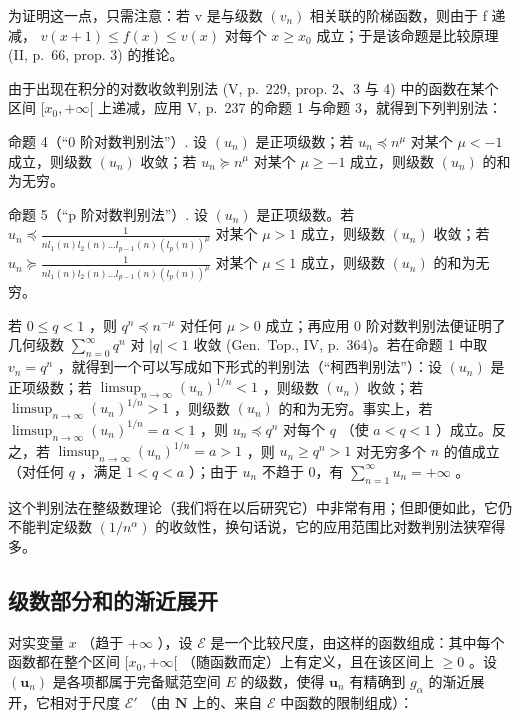 为证明这一点，只需注意：若 v 是与级数 \((v_{n})\) 相关联的阶梯函数，则由于 f 递减， \(v(x+1) \leqslant f(x) \leqslant v(x)\) 对每个 \(x \geqslant x_{0}\) 成立；于是该命题是比较原理 (II, p.~66, prop. 3) 的推论。

由于出现在积分的对数收敛判别法 (V, p.~229, prop. 2、3 与 4) 中的函数在某个区间 \([x_{0}, +\infty[\) 上递减，应用 V, p.~237 的命题 1 与命题 3，就得到下列判别法：

命题 4（“0 阶对数判别法”）. 设 \((u_{n})\) 是正项级数；若 \(u_{n} \preccurlyeq n^{\mu}\) 对某个 \(\mu < -1\) 成立，则级数 \((u_{n})\) 收敛；若 \(u_{n} \succcurlyeq n^{\mu}\) 对某个 \(\mu \geqslant -1\) 成立，则级数 \((u_{n})\) 的和为无穷。

命题 5（“p 阶对数判别法”）. 设 \((u_{n})\) 是正项级数。若 \(u_{n} \preccurlyeq \frac{1}{nl_{1}(n)l_{2}(n)\ldots l_{p-1}(n)(l_{p}(n))^{\mu}}\) 对某个 \(\mu > 1\) 成立，则级数 \((u_{n})\) 收敛；若 \(u_{n} \succcurlyeq \frac{1}{nl_{1}(n)l_{2}(n)\ldots l_{p-1}(n)(l_{p}(n))^{\mu}}\) 对某个 \(\mu \leqslant 1\) 成立，则级数 \((u_{n})\) 的和为无穷。

若 \(0 \leqslant q < 1\) ，则 \(q^n \preccurlyeq n^{-\mu}\) 对任何 \(\mu > 0\) 成立；再应用 0 阶对数判别法便证明了几何级数 \(\sum_{n=0}^{\infty} q^n\) 对 \(|q| < 1\) 收敛 (Gen.~Top., IV, p.~364)。若在命题 1 中取 \(v_n = q^n\) ，就得到一个可以写成如下形式的判别法（“柯西判别法”）：设 \((u_n)\) 是正项级数；若 \(\limsup_{n \to \infty} (u_n)^{1/n} < 1\) ，则级数 \((u_n)\) 收敛；若 \(\limsup_{n \to \infty} (u_n)^{1/n} > 1\) ，则级数 \((u_n)\) 的和为无穷。事实上，若 \(\limsup_{n \to \infty} (u_n)^{1/n} = a < 1\) ，则 \(u_n \preccurlyeq q^n\) 对每个 \(q\) （使 \(a < q < 1\) ）成立。反之，若 \(\limsup_{n \to \infty} (u_n)^{1/n} = a > 1\) ，则 \(u_n \geqslant q^n > 1\) 对无穷多个 \(n\) 的值成立（对任何 \(q\) ，满足 \(1 < q < a\) ）；由于 \(u_n\) 不趋于 0，有 \(\sum_{n=1}^{\infty} u_n = +\infty\) 。

这个判别法在整级数理论（我们将在以后研究它）中非常有用；但即便如此，它仍不能判定级数 \((1/n^{\alpha})\) 的收敛性，换句话说，它的应用范围比对数判别法狭窄得多。

\subsection{级数部分和的渐近展开}

对实变量 \(x\) （趋于 \(+\infty\) ），设 \(\mathcal{E}\) 是一个比较尺度，由这样的函数组成：其中每个函数都在整个区间 \([x_0, +\infty[\) （随函数而定）上有定义，且在该区间上 \(\geqslant 0\) 。设 \((\mathbf{u}_n)\) 是各项都属于完备赋范空间 \(E\) 的级数，使得 \(\mathbf{u}_n\) 有精确到 \(g_\alpha\) 的渐近展开，它相对于尺度 \(\mathcal{E}'\) （由 \(\mathbf{N}\) 上的、来自 \(\mathcal{E}\) 中函数的限制组成）：

